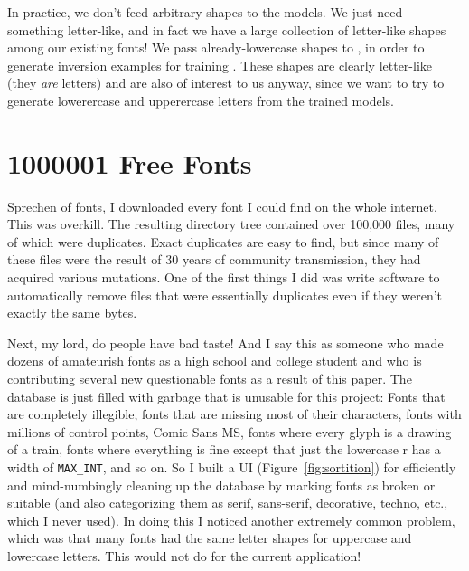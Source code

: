 \documentclass[twocolumn]{amsart}
\begin{document}
In practice, we don't feed arbitrary shapes to the models. We just
need something letter-like, and in fact we have a large collection of
letter-like shapes among our existing fonts! We pass already-lowercase
shapes to \makelowercase, in order to generate inversion examples for
training \makeuppercase. These shapes are clearly letter-like (they
{\em are} letters) and are also of interest to us anyway, since we
want to try to generate lowerercase and upperercase letters from
the trained models.


\section{1000001 Free Fonts}

Sprechen of fonts, I downloaded every font I could find on the whole
internet. This was overkill. The resulting directory tree contained
over 100,000 files, many of which were duplicates. Exact duplicates
are easy to find, but since many of these files were the result of 30
years of community transmission, they had acquired various mutations.
One of the first things I did was write software to automatically
remove files that were essentially duplicates even if they weren't
exactly the same bytes.

Next, my lord, do people have bad taste! And I say this as someone who
made dozens of amateurish fonts\cite{dbzfonts} as a high school and
college student and who is contributing several new questionable
fonts\label{sec:newfonts} as a result of this paper. The database is
just filled with garbage that is unusable for this project: Fonts that
are completely illegible, fonts that are missing most of their
characters, fonts with millions of control points, Comic Sans MS,
fonts where every glyph is a drawing of a train, fonts where
everything is fine except that just the lowercase r has a width of
{\tt MAX\_INT}, and so on. So I built a UI
(Figure~\ref{fig:sortition}) for efficiently and mind-numbingly
cleaning up the database by marking fonts as broken or suitable (and
also categorizing them as serif, sans-serif, decorative, techno, etc.,
which I never used). In doing this I noticed another extremely common
problem, which was that many fonts had the same letter shapes for
uppercase and lowercase letters. This would not do for the current
application!
\end{document}
